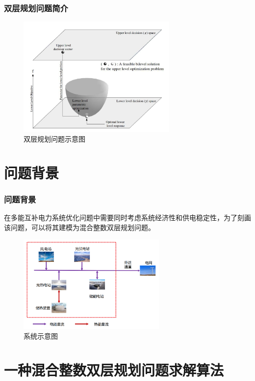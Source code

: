 \documentclass[10pt]{beamer}
\begin{document}
\begin{frame}
	\frametitle{双层规划问题简介}
	\begin{figure}
		\centering
		\includegraphics[width=0.7\textwidth]{pic/双层问题示意图.png}
		\caption{双层规划问题示意图}
	\end{figure}
\end{frame}

\section{问题背景}

\begin{frame}
	\frametitle{问题背景} 
	在多能互补电力系统优化问题中需要同时考虑系统经济性和供电稳定性，为了刻画该问题，可以将其建模为混合整数双层规划问题。
	\begin{figure}
		\centering
		\includegraphics[width=0.65\textwidth]{pic/系统结构示意图.png}
		\caption{系统示意图}
	\end{figure}
\end{frame}

\section{一种混合整数双层规划问题求解算法} 
\end{document}
